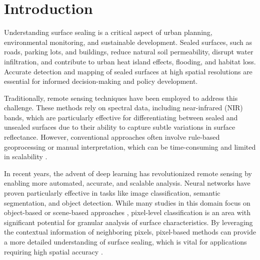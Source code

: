 

\section{Introduction}
\label{introduction}

Understanding surface sealing is a critical aspect of urban planning, environmental 
monitoring, and sustainable development. Sealed surfaces, such as roads, parking lots, 
and buildings, reduce natural soil permeability, disrupt water infiltration, and 
contribute to urban heat island effects, flooding, and habitat loss. Accurate detection 
and mapping of sealed surfaces at high spatial resolutions are essential for informed 
decision-making and policy development.

Traditionally, remote sensing techniques have been employed to address this challenge. 
These methods rely on spectral data, including near-infrared (NIR) bands, which are 
particularly effective for differentiating between sealed and unsealed surfaces due to 
their ability to capture subtle variations in surface reflectance. However, conventional 
approaches often involve rule-based geoprocessing or manual interpretation, which can be 
time-consuming and limited in scalability \autocite{kadhimAdvancesRemoteSensing2016}.

In recent years, the advent of deep learning has revolutionized remote sensing by 
enabling more automated, accurate, and scalable analysis. Neural networks have proven 
particularly effective in tasks like image classification, semantic segmentation, and 
object detection. While many studies in this domain focus on object-based or scene-based 
approaches \autocite{thapaDeepLearningRemote2023}, pixel-level classification is 
an area with significant potential for granular analysis of surface characteristics. By 
leveraging the contextual information of neighboring pixels, pixel-based methods can 
provide a more detailed understanding of surface sealing, which is vital for 
applications requiring high spatial accuracy \autocite{zhengHighSpatialResolution2023}.

